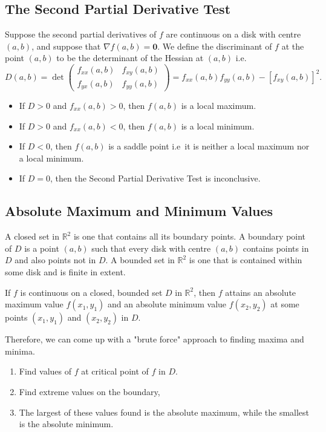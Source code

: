 \documentclass{article}
\begin{document}
\subsection{The Second Partial Derivative Test}
Suppose the second partial derivatives of $f$ are continuous on a disk with centre $(a,b)$, and suppose that $\nabla f(a,b)=\bm{0}.$ We define the discriminant of $f$ at the point $(a,b)$ to be the determinant of the Hessian at $(a,b)$ i.e.
$$D(a,b)=\det\begin{pmatrix}
    f_{xx}(a,b)&f_{xy}(a,b)\\
    f_{yx}(a,b)&f_{yy}(a,b)
\end{pmatrix}=f_{xx}(a,b)f_{yy}(a,b)-[f_{xy}(a,b)]^2.$$
\begin{itemize}
    \item If $D>0$ and $f_{xx}(a,b)>0$, then $f(a,b)$ is a local maximum.
    \item If $D>0$ and $f_{xx}(a,b)<0$, then $f(a,b)$ is a local minimum.
    \item If $D<0$, then $f(a,b)$ is a saddle point i.e\ it is neither a local maximum nor a local minimum.
    \item If $D=0$, then the Second Partial Derivative Test is inconclusive.
\end{itemize}
\subsection{Absolute Maximum and Minimum Values}
\begin{definition}
    A closed set in $\mathbb{R}^2$ is one that contains all its boundary points. A boundary point of $D$ is a point $(a,b)$ such that every disk with centre $(a,b)$ contains points in $D$ and also points not in $D$. A bounded set in $\mathbb{R}^2$ is one that is contained within some disk and is finite in extent.
\end{definition}
\begin{theorem}
    If $f$ is continuous on a closed, bounded set $D$ in $\mathbb{R}^2$, then $f$ attains an absolute maximum value $f(x_1,y_1)$ and an absolute minimum value $f(x_2,y_2)$ at some points $(x_1,y_1)$ and $(x_2,y_2)$ in $D$.
\end{theorem}
Therefore, we can come up with a "brute force" approach to finding maxima and minima.
\begin{enumerate}
    \item Find values of $f$ at critical point of $f$ in $D$.
    \item Find extreme values on the boundary,
    \item The largest of these values found is the absolute maximum, while the smallest is the absolute minimum.
\end{enumerate}
\end{document}
